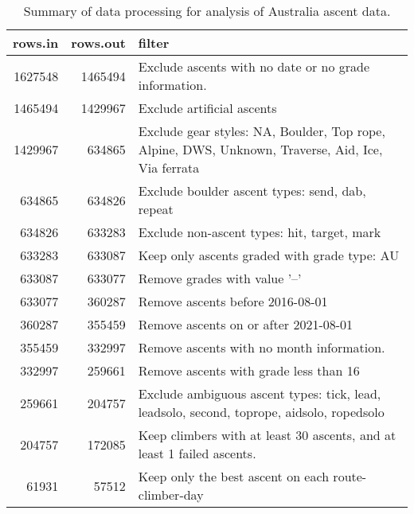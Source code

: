 \begin{table}[ht]
\centering
\begingroup\fontsize{9pt}{10pt}\selectfont
\begin{tabular}{rrl}
  \hline
{\bf rows.in} & {\bf rows.out} & {\bf filter} \\ 
  \hline
1627548 & 1465494 & Exclude ascents with no date or no grade information. \\ 
  1465494 & 1429967 & Exclude artificial ascents \\ 
  1429967 & 634865 & Exclude gear styles: NA, Boulder, Top rope, Alpine, DWS, Unknown, Traverse, Aid, Ice, Via ferrata \\ 
  634865 & 634826 & Exclude boulder ascent types: send, dab, repeat \\ 
  634826 & 633283 & Exclude non-ascent types: hit, target, mark \\ 
  633283 & 633087 & Keep only ascents graded with grade type: AU \\ 
  633087 & 633077 & Remove grades with value '--' \\ 
  633077 & 360287 & Remove ascents before 2016-08-01 \\ 
  360287 & 355459 & Remove ascents on or after 2021-08-01 \\ 
  355459 & 332997 & Remove ascents with no month information. \\ 
  332997 & 259661 & Remove ascents with grade less than 16 \\ 
  259661 & 204757 & Exclude ambiguous ascent types: tick, lead, leadsolo, second, toprope, aidsolo, ropedsolo \\ 
  204757 & 172085 & Keep climbers with at least 30 ascents, and at least 1 failed ascents. \\ 
  61931 & 57512 & Keep only the best ascent on each route-climber-day \\ 
   \hline
\end{tabular}
\endgroup
\caption{Summary of data processing for analysis of Australia ascent data.} 
\label{table-data-processing-aus}
\end{table}
